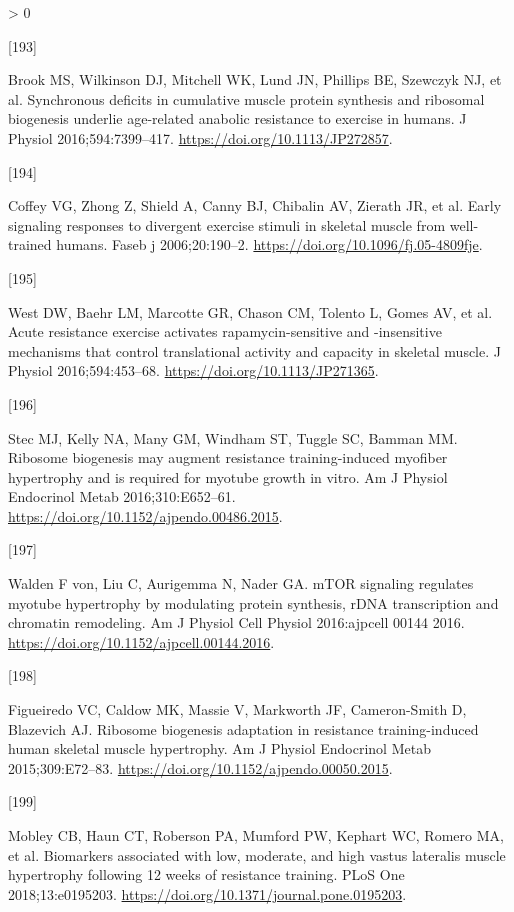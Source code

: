 \documentclass[twoside,10pt]{gihclass} %
\newlength{\cslhangindent}
\newlength{\csllabelwidth}
\newenvironment{CSLReferences}[3] %
 {%
  \setlength{\parindent}{0pt}
  \ifodd #1 \everypar{\setlength{\hangindent}{\cslhangindent}}\ignorespaces\fi
  \ifnum #2 > 0
  \setlength{\parskip}{#2\baselineskip}
  \fi
 }%
 {}
\newcommand{\CSLLeftMargin}[1]{\parbox[t]{\maxof{\widthof{#1}}{\csllabelwidth}}{#1}}
\newcommand{\CSLRightInline}[1]{\parbox[t]{\linewidth}{#1}}
\begin{document}
\begin{CSLReferences}{0}{0}
\leavevmode\hypertarget{ref-RN1809}{}%
\CSLLeftMargin{{[}193{]} }
\CSLRightInline{Brook MS, Wilkinson DJ, Mitchell WK, Lund JN, Phillips BE, Szewczyk NJ, et al. Synchronous deficits in cumulative muscle protein synthesis and ribosomal biogenesis underlie age-related anabolic resistance to exercise in humans. J Physiol 2016;594:7399--417. \url{https://doi.org/10.1113/JP272857}.}

\leavevmode\hypertarget{ref-RN1871}{}%
\CSLLeftMargin{{[}194{]} }
\CSLRightInline{Coffey VG, Zhong Z, Shield A, Canny BJ, Chibalin AV, Zierath JR, et al. Early signaling responses to divergent exercise stimuli in skeletal muscle from well-trained humans. Faseb j 2006;20:190--2. \url{https://doi.org/10.1096/fj.05-4809fje}.}

\leavevmode\hypertarget{ref-RN1754}{}%
\CSLLeftMargin{{[}195{]} }
\CSLRightInline{West DW, Baehr LM, Marcotte GR, Chason CM, Tolento L, Gomes AV, et al. Acute resistance exercise activates rapamycin-sensitive and -insensitive mechanisms that control translational activity and capacity in skeletal muscle. J Physiol 2016;594:453--68. \url{https://doi.org/10.1113/JP271365}.}

\leavevmode\hypertarget{ref-RN1755}{}%
\CSLLeftMargin{{[}196{]} }
\CSLRightInline{Stec MJ, Kelly NA, Many GM, Windham ST, Tuggle SC, Bamman MM. Ribosome biogenesis may augment resistance training-induced myofiber hypertrophy and is required for myotube growth in vitro. Am J Physiol Endocrinol Metab 2016;310:E652--61. \url{https://doi.org/10.1152/ajpendo.00486.2015}.}

\leavevmode\hypertarget{ref-RN1810}{}%
\CSLLeftMargin{{[}197{]} }
\CSLRightInline{Walden F von, Liu C, Aurigemma N, Nader GA. mTOR signaling regulates myotube hypertrophy by modulating protein synthesis, rDNA transcription and chromatin remodeling. Am J Physiol Cell Physiol 2016:ajpcell 00144 2016. \url{https://doi.org/10.1152/ajpcell.00144.2016}.}

\leavevmode\hypertarget{ref-RN1644}{}%
\CSLLeftMargin{{[}198{]} }
\CSLRightInline{Figueiredo VC, Caldow MK, Massie V, Markworth JF, Cameron-Smith D, Blazevich AJ. Ribosome biogenesis adaptation in resistance training-induced human skeletal muscle hypertrophy. Am J Physiol Endocrinol Metab 2015;309:E72--83. \url{https://doi.org/10.1152/ajpendo.00050.2015}.}

\leavevmode\hypertarget{ref-RN2055}{}%
\CSLLeftMargin{{[}199{]} }
\CSLRightInline{Mobley CB, Haun CT, Roberson PA, Mumford PW, Kephart WC, Romero MA, et al. Biomarkers associated with low, moderate, and high vastus lateralis muscle hypertrophy following 12 weeks of resistance training. PLoS One 2018;13:e0195203. \url{https://doi.org/10.1371/journal.pone.0195203}.}


\end{CSLReferences}
\end{document}
